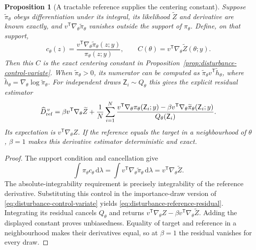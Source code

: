 \documentclass[11pt]{article}
\newtheorem{proposition}{Proposition}
\newcommand{\dd}{\mathrm{d}}
\begin{document}
\begin{proposition}[A tractable reference supplies the centering constant]
\label{prop:disturbance-reference-control}
Suppose $\widetilde\pi_\theta$ obeys differentiation under its integral, its
likelihood $\widetilde Z$ and derivative are known exactly, and
$v^{\mathsf T}\nabla_\theta\widetilde\pi_\theta$ vanishes outside the support
of $\pi_\theta$. Define, on that support,
\begin{equation}
 c_\theta(z)=
 \frac{v^{\mathsf T}\nabla_\theta\widetilde\pi_\theta(z;y)}
      {\pi_\theta(z;y)},\qquad
 C(\theta)=v^{\mathsf T}\nabla_\theta\widetilde Z(\theta;y).
 \label{eq:disturbance-reference-control}
\end{equation}
Then this $C$ is the exact centering constant in
Proposition~\ref{prop:disturbance-control-variate}. When
$\widetilde\pi_\theta>0$, its numerator can be computed as
$\widetilde\pi_\theta v^{\mathsf T}\widetilde h_\theta$,
where $\widetilde h_\theta=\nabla_\theta\log\widetilde\pi_\theta$.
For independent draws $\mathsf Z_i\sim Q_\theta$ this gives the explicit
residual estimator
\begin{equation}
 \widehat D_{\rm ref}^{\,v}
 =\beta v^{\mathsf T}\nabla_\theta\widetilde Z+
 \frac1N\sum_{i=1}^N
 \frac{v^{\mathsf T}\nabla_\theta\pi_\theta(\mathsf Z_i;y)
       -\beta v^{\mathsf T}\nabla_\theta
                    \widetilde\pi_\theta(\mathsf Z_i;y)}
      {Q_\theta(\mathsf Z_i)}.
 \label{eq:disturbance-reference-residual}
\end{equation}
Its expectation is $v^{\mathsf T}\nabla_\theta Z$. If the reference equals
the target in a neighbourhood of $\theta$, $\beta=1$ makes this derivative
estimator deterministic and exact.
\end{proposition}

\begin{proof}
The support condition and cancellation give
\[
 \int\pi_\theta c_\theta\,\dd\lambda
 =\int v^{\mathsf T}\nabla_\theta\widetilde\pi_\theta\,\dd\lambda
 =v^{\mathsf T}\nabla_\theta\widetilde Z.
\]
The absolute-integrability requirement is precisely integrability of the
reference derivative. Substituting this control in the importance-draw
version of \eqref{eq:disturbance-control-variate} yields
\eqref{eq:disturbance-reference-residual}. Integrating its residual cancels
$Q_\theta$ and returns
$v^{\mathsf T}\nabla_\theta Z-\beta
 v^{\mathsf T}\nabla_\theta\widetilde Z$.
Adding the displayed constant proves unbiasedness. Equality of target and
reference in a neighbourhood makes their derivatives equal, so at $\beta=1$
the residual vanishes for every draw.
\end{proof}
\end{document}
